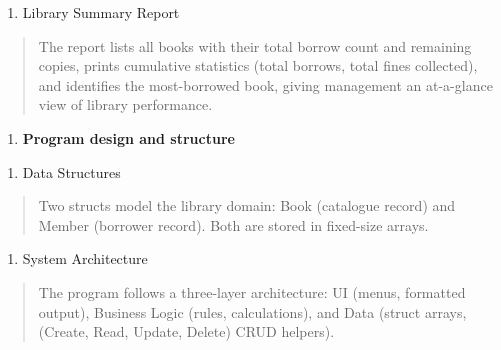 \documentclass[
]{article}
\begin{document}
\begin{enumerate}
\def\labelenumi{\alph{enumi})}
\setcounter{enumi}{4}
\item
  Library Summary Report
\end{enumerate}

\begin{quote}
The report lists all books with their total borrow count and remaining
copies, prints cumulative statistics (total borrows, total fines
collected), and identifies the most-borrowed book, giving management an
at-a-glance view of library performance.
\end{quote}

\begin{enumerate}
\def\labelenumi{\arabic{enumi}.}
\setcounter{enumi}{3}
\item
  \textbf{Program design and structure}
\end{enumerate}

\begin{enumerate}
\def\labelenumi{\alph{enumi})}
\item
  Data Structures
\end{enumerate}

\begin{quote}
Two structs model the library domain: Book (catalogue record) and Member
(borrower record). Both are stored in fixed-size arrays.
\end{quote}

\begin{enumerate}
\def\labelenumi{\alph{enumi})}
\setcounter{enumi}{1}
\item
  System Architecture
\end{enumerate}

\begin{quote}
The program follows a three-layer architecture: UI (menus, formatted
output), Business Logic (rules, calculations), and Data (struct arrays,
(Create, Read, Update, Delete) CRUD helpers).
\end{quote}
\end{document}
